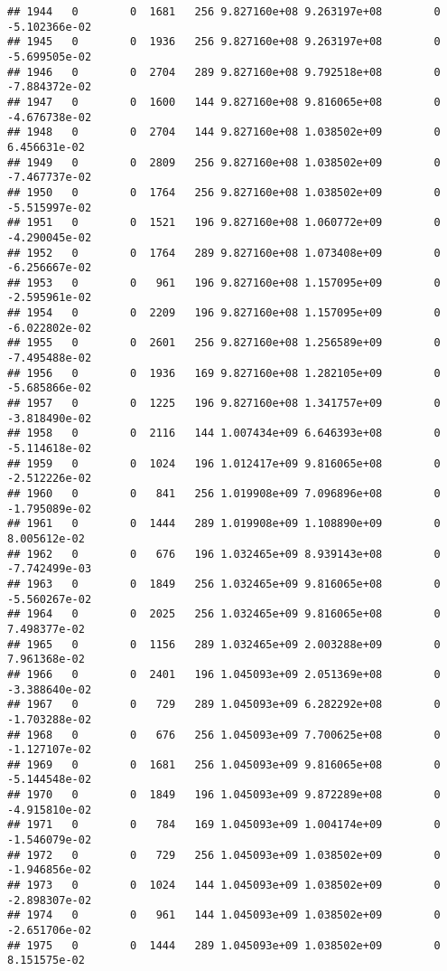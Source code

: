 \documentclass[
]{article}
\begin{document}
\begin{enumerate}
\begin{verbatim}
## 1944   0        0  1681   256 9.827160e+08 9.263197e+08        0 -5.102366e-02
## 1945   0        0  1936   256 9.827160e+08 9.263197e+08        0 -5.699505e-02
## 1946   0        0  2704   289 9.827160e+08 9.792518e+08        0 -7.884372e-02
## 1947   0        0  1600   144 9.827160e+08 9.816065e+08        0 -4.676738e-02
## 1948   0        0  2704   144 9.827160e+08 1.038502e+09        0  6.456631e-02
## 1949   0        0  2809   256 9.827160e+08 1.038502e+09        0 -7.467737e-02
## 1950   0        0  1764   256 9.827160e+08 1.038502e+09        0 -5.515997e-02
## 1951   0        0  1521   196 9.827160e+08 1.060772e+09        0 -4.290045e-02
## 1952   0        0  1764   289 9.827160e+08 1.073408e+09        0 -6.256667e-02
## 1953   0        0   961   196 9.827160e+08 1.157095e+09        0 -2.595961e-02
## 1954   0        0  2209   196 9.827160e+08 1.157095e+09        0 -6.022802e-02
## 1955   0        0  2601   256 9.827160e+08 1.256589e+09        0 -7.495488e-02
## 1956   0        0  1936   169 9.827160e+08 1.282105e+09        0 -5.685866e-02
## 1957   0        0  1225   196 9.827160e+08 1.341757e+09        0 -3.818490e-02
## 1958   0        0  2116   144 1.007434e+09 6.646393e+08        0 -5.114618e-02
## 1959   0        0  1024   196 1.012417e+09 9.816065e+08        0 -2.512226e-02
## 1960   0        0   841   256 1.019908e+09 7.096896e+08        0 -1.795089e-02
## 1961   0        0  1444   289 1.019908e+09 1.108890e+09        0  8.005612e-02
## 1962   0        0   676   196 1.032465e+09 8.939143e+08        0 -7.742499e-03
## 1963   0        0  1849   256 1.032465e+09 9.816065e+08        0 -5.560267e-02
## 1964   0        0  2025   256 1.032465e+09 9.816065e+08        0  7.498377e-02
## 1965   0        0  1156   289 1.032465e+09 2.003288e+09        0  7.961368e-02
## 1966   0        0  2401   196 1.045093e+09 2.051369e+08        0 -3.388640e-02
## 1967   0        0   729   289 1.045093e+09 6.282292e+08        0 -1.703288e-02
## 1968   0        0   676   256 1.045093e+09 7.700625e+08        0 -1.127107e-02
## 1969   0        0  1681   256 1.045093e+09 9.816065e+08        0 -5.144548e-02
## 1970   0        0  1849   196 1.045093e+09 9.872289e+08        0 -4.915810e-02
## 1971   0        0   784   169 1.045093e+09 1.004174e+09        0 -1.546079e-02
## 1972   0        0   729   256 1.045093e+09 1.038502e+09        0 -1.946856e-02
## 1973   0        0  1024   144 1.045093e+09 1.038502e+09        0 -2.898307e-02
## 1974   0        0   961   144 1.045093e+09 1.038502e+09        0 -2.651706e-02
## 1975   0        0  1444   289 1.045093e+09 1.038502e+09        0  8.151575e-02

\end{verbatim}
\end{enumerate}
\end{document}
